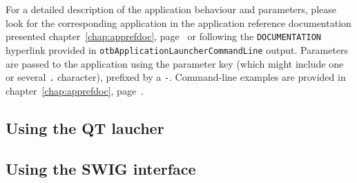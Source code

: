 For a detailed description of the application behaviour and
parameters, please look for the corresponding application in the
application reference documentation presented
chapter~\ref{chap:apprefdoc}, page~\pageref{chap:apprefdoc} or
following the \verb?DOCUMENTATION? hyperlink provided in
\verb?otbApplicationLauncherCommandLine? output. Parameters are passed
to the application using the parameter key (which might include one or
several \verb?.? character), prefixed by a \verb?-?. Command-line
examples are provided in chapter~\ref{chap:apprefdoc},
page~\pageref{chap:apprefdoc}.

\subsection{Using the QT laucher}

\subsection{Using the SWIG interface}

